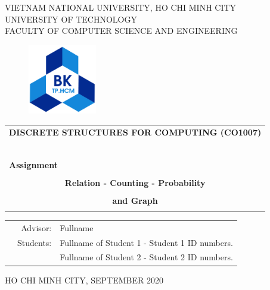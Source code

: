\documentclass[a4paper]{article}
\begin{document}
    \begin{titlepage}
        \begin{center}
            VIETNAM NATIONAL UNIVERSITY, HO CHI MINH CITY \\
            UNIVERSITY OF TECHNOLOGY \\
            FACULTY OF COMPUTER SCIENCE AND ENGINEERING
        \end{center}
        \vspace{1cm}
        \begin{figure}[h!]
            \begin{center}
                \includegraphics[width=3cm]{hcmut.png}
            \end{center}\label{fig:figure}
        \end{figure}
        \vspace{1cm}
        \begin{center}
            \begin{tabular}{c}
                \multicolumn{1}{l}{\textbf{{\Large DISCRETE STRUCTURES FOR COMPUTING (CO1007)}}}\\
                ~~                                                                               \\
                \hline
                \\
                \multicolumn{1}{l}{\textbf{{\Large Assignment}}}                               \\
                \\
                \textbf{{\Huge Relation - Counting - Probability}}\\
                \\
                \textbf{{\Huge and Graph}}\\
                \\
                \hline
            \end{tabular}
        \end{center}
        \vspace{3cm}
        \begin{table}[h]
            \begin{tabular}{rrl}
                \hspace{5 cm} & Advisor:  & Fullname                                      \\
                & Students: & Fullname of Student 1 - Student 1 ID numbers. \\
                &           & Fullname of Student 2 - Student 2 ID numbers. \\
            \end{tabular}\label{tab:table}
        \end{table}
        \begin{center}
        {\footnotesize HO CHI MINH CITY, SEPTEMBER 2020}
        \end{center}
    \end{titlepage}
\end{document}
